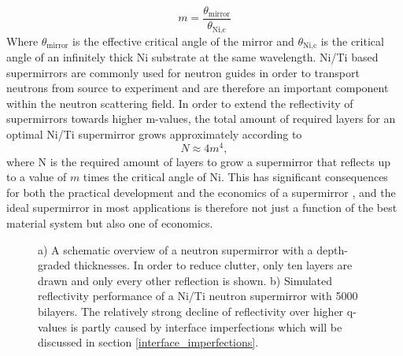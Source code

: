 \begin{equation}
	m = \frac{\theta_{\textrm{mirror}}}{\theta_{\textrm{Ni,c}}}
\end{equation}
Where $\theta_{\textrm{mirror}}$ is the effective critical angle of the mirror and $\theta_{\textrm{Ni,c}}$ is the critical angle of an infinitely thick Ni substrate at the same wavelength. Ni/Ti based supermirrors are commonly used for neutron guides in order to transport neutrons from source to experiment and are therefore an important component within the neutron scattering field. In order to extend the reflectivity of supermirrors towards higher m-values, the total amount of required layers for an optimal Ni/Ti supermirror grows approximately according to \cite{boni_supermirrors}
\begin{equation}
	N \approx 4m^4,
\end{equation}
where N is the required amount of layers to grow a supermirror that reflects up to a value of $m$ times the critical angle of Ni. This has significant consequences for both the practical development and the economics of a supermirror \cite{supermirror_economics}, and the ideal supermirror in most applications is therefore not just a function of the best material system but also one of economics.
\begin{figure}[hb]
	\centering
	\def\svgwidth{\textwidth}
	
	\caption{a) A schematic overview of a neutron supermirror with a depth-graded
		thicknesses. In order to reduce clutter, only ten layers are drawn and only every other reflection is shown. b) Simulated reflectivity performance of a Ni/Ti neutron supermirror with 5000 bilayers. The relatively strong decline of reflectivity over higher q-values is partly caused by interface imperfections which will be discussed in section \ref{interface_imperfections}.}
	\label{supermirror_sketch}
\end{figure}
\clearpage
